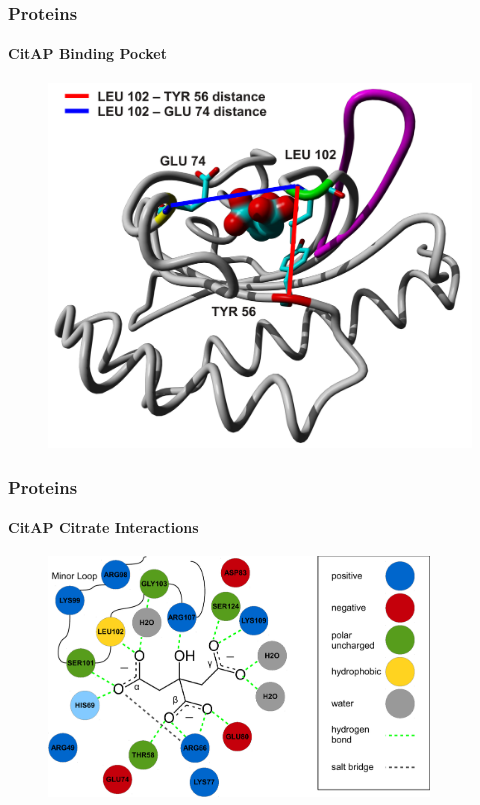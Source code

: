 \documentclass[english]{beamer}
\begin{document}
%


\begin{frame}
    \frametitle{Proteins}
    \framesubtitle{CitAP Binding Pocket}

    \begin{figure}
        \includegraphics[width=.7\linewidth]{figures/CitA_pocket2.pdf}
    \end{figure}     
\end{frame}     


\begin{frame}
    \frametitle{Proteins}
    \framesubtitle{CitAP Citrate Interactions}

    \begin{figure}
        \includegraphics[width=0.9\textwidth]{figures/citrate_interactions/citrate_interactions.pdf}
    \end{figure}     
\end{frame}      
\end{document}

